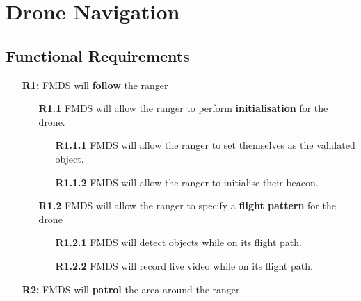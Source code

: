 \section{Drone Navigation}

\subsection{Functional Requirements}

	\begin{flushleft}
		\begin{itemize}
			\item [\textbf{R1:}] FMDS will \textbf{follow} the ranger

		  		\begin{itemize}
		  			\item  [\textbf{R1.1}] FMDS will allow the ranger to perform \textbf{initialisation} for the drone.
		  				\begin{itemize}
		  					\item [\textbf{R1.1.1}] FMDS will allow the ranger to set themselves as the validated object.
		  					\item [\textbf{R1.1.2}] FMDS will allow the ranger to initialise their beacon. 
		  				\end{itemize}

		  			\item  [\textbf{R1.2}] FMDS will allow the ranger to specify a \textbf{flight pattern} for the drone
		  				\begin{itemize}
		  					\item [\textbf{R1.2.1}] FMDS will detect objects while on its flight path.
		  					\item [\textbf{R1.2.2}] FMDS will record live video while on its flight path.
						  \end{itemize}
			\end{itemize}
		\end{itemize}

		\begin{itemize}
			\item [\textbf{R2:}] FMDS will \textbf{patrol} the area around the ranger


\end{itemize}
\end{flushleft}
